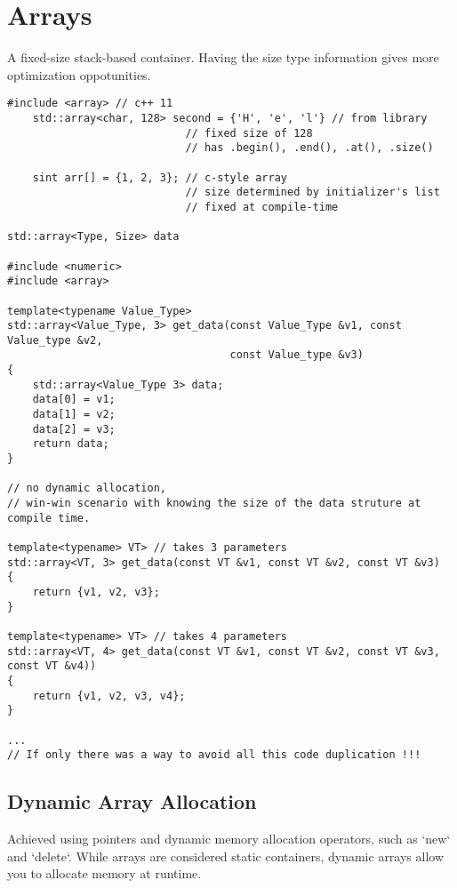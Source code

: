 \section{Arrays}

A fixed-size stack-based container. Having the size type information gives more optimization oppotunities.

\begin{verbatim}
#include <array> // c++ 11
    std::array<char, 128> second = {'H', 'e', 'l'} // from library
                            // fixed size of 128
                            // has .begin(), .end(), .at(), .size() 

    sint arr[] = {1, 2, 3}; // c-style array 
                            // size determined by initializer's list
                            // fixed at compile-time 

std::array<Type, Size> data

#include <numeric>
#include <array>

template<typename Value_Type>
std::array<Value_Type, 3> get_data(const Value_Type &v1, const Value_type &v2,
                                   const Value_type &v3)
{
    std::array<Value_Type 3> data;
    data[0] = v1;
    data[1] = v2;
    data[2] = v3;
    return data;
}

// no dynamic allocation, 
// win-win scenario with knowing the size of the data struture at compile time.

template<typename> VT> // takes 3 parameters
std::array<VT, 3> get_data(const VT &v1, const VT &v2, const VT &v3)
{
    return {v1, v2, v3};
}

template<typename> VT> // takes 4 parameters
std::array<VT, 4> get_data(const VT &v1, const VT &v2, const VT &v3, const VT &v4))
{
    return {v1, v2, v3, v4};
}

... 
// If only there was a way to avoid all this code duplication !!!
\end{verbatim}

\subsection{Dynamic Array Allocation}

Achieved using pointers and dynamic memory allocation operators, such as `new` and `delete`. 
While arrays are considered static containers,
dynamic arrays allow you to allocate memory at runtime.

